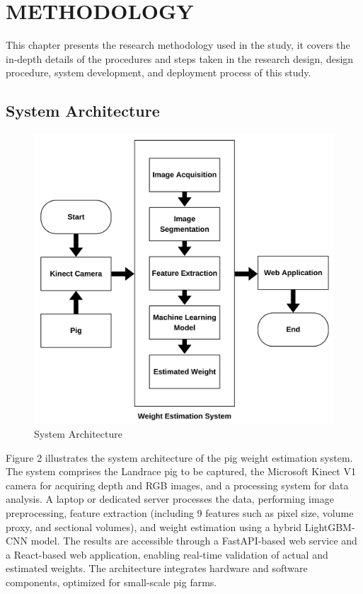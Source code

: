 \chapter{METHODOLOGY}
{\baselineskip
	
This chapter presents the research methodology used in the study, it covers the in-depth details of the procedures and steps taken in the research design, design procedure, system development, and deployment process of this study.


\section {System Architecture} \label{Section 3.1}

\begin{figure}[h]
	\centering
	\includegraphics[height=0.5\textheight]{figures/Architectureofniggas}
	\caption{System Architecture}
	\label{fig:System Architecture}
\end{figure}

Figure 2 illustrates the system architecture of the pig weight estimation system. The system comprises the Landrace pig to be captured, the Microsoft Kinect V1 camera for acquiring depth and RGB images, and a processing system for data analysis. A laptop or dedicated server processes the data, performing image preprocessing, feature extraction (including 9 features such as pixel size, volume proxy, and sectional volumes), and weight estimation using a hybrid LightGBM-CNN model. The results are accessible through a FastAPI-based web service and a React-based web application, enabling real-time validation of actual and estimated weights. The architecture integrates hardware and software components, optimized for small-scale pig farms.

}
